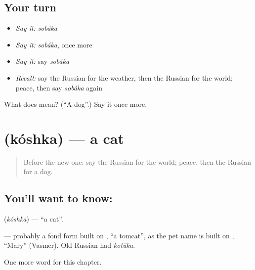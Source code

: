\subsection*{Your turn}
\begin{itemize}
\raggedright
  \item \emph{Say it:} \emph{sobáka}
  \item \emph{Say it:} \emph{sobáka}, once more
  \item \emph{Say it:} say \emph{sobáka}
  \item \emph{Recall:} say the Russian for the weather, then the Russian for the world; peace, then say \emph{sobáka} again
\end{itemize}

\begin{tcolorbox}[breakable,colback=teal!4,colframe=teal!35!black,title={Before you move on}]
What does  mean? (\textquotedblleft{}A dog\textquotedblright{}.) Say it once more.
\end{tcolorbox}
\section[\texorpdfstring{\ru{кошка} (kóshka)}{кошка (kóshka)}]{ (kóshka) — a cat}

\label{lesson:RU-C60-cat}



\begin{quote}
Before the new one: say the Russian for the world; peace, then the Russian for a dog.
\end{quote}

\subsection*{You'll want to know: }
\textbf{} (\emph{kóshka}) — \textquotedblleft{}a cat\textquotedblright{}.

\begin{cousinweb}
\textbf{} — probably a fond form built on \emph{}, \textquotedblleft{}a tomcat\textquotedblright{}, as the pet name \emph{} is built on \emph{}, \textquotedblleft{}Mary\textquotedblright{} (Vasmer). Old Russian had \emph{kotŭka}.
\end{cousinweb}

\begin{grammarlens}[title={What you've built}]
One more word for this chapter.
\end{grammarlens}

